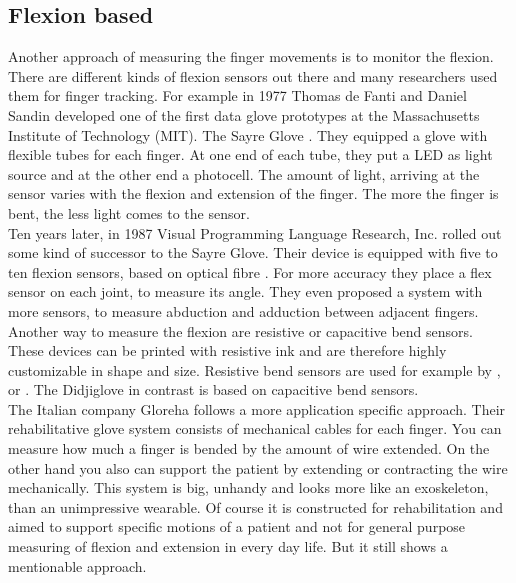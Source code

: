 \subsection{Flexion based}
Another approach of measuring the finger movements is to monitor the flexion. There are different kinds of flexion sensors out there and many researchers used them for finger tracking. For example in 1977 Thomas de Fanti and Daniel Sandin developed one of the first data glove prototypes at the Massachusetts Institute of Technology (MIT). The Sayre Glove  \cite{sturman1994survey}. They equipped a glove with flexible tubes for each finger. At one end of each tube, they put a LED as light source and at the other end a photocell. The amount of light, arriving at the sensor varies with the flexion and extension of the finger. The more the finger is bent, the less light comes to the sensor.\\
Ten years later, in 1987 Visual Programming Language Research, Inc. rolled out some kind of successor to the Sayre Glove. Their device is equipped with five to ten flexion sensors, based on optical fibre \cite{zimmerman1985optical}. For more accuracy they place a flex sensor on each joint, to measure its angle. They even proposed a system with more sensors, to measure abduction and adduction between adjacent fingers.\\
Another way to measure the flexion are resistive or capacitive bend sensors. These devices can be printed with resistive ink and are therefore highly customizable in shape and size. Resistive bend sensors are used for example by \cite{o2013novel}, \cite{zecca2007development} or \cite{FifthDimension}. The Didjiglove \cite{sturman1994survey} in contrast is based on capacitive bend sensors.\\
The Italian company Gloreha \cite{Gloreha} follows a more application specific approach. Their rehabilitative glove system consists of mechanical cables for each finger. You can measure how much a finger is bended by the amount of wire extended. On the other hand you also can support the patient by extending or contracting the wire mechanically. This system is big, unhandy and looks more like an exoskeleton, than an unimpressive wearable. Of course it is constructed for rehabilitation and aimed to support specific motions of a patient and not for general purpose measuring of flexion and extension in every day life. But it still shows a mentionable approach.

